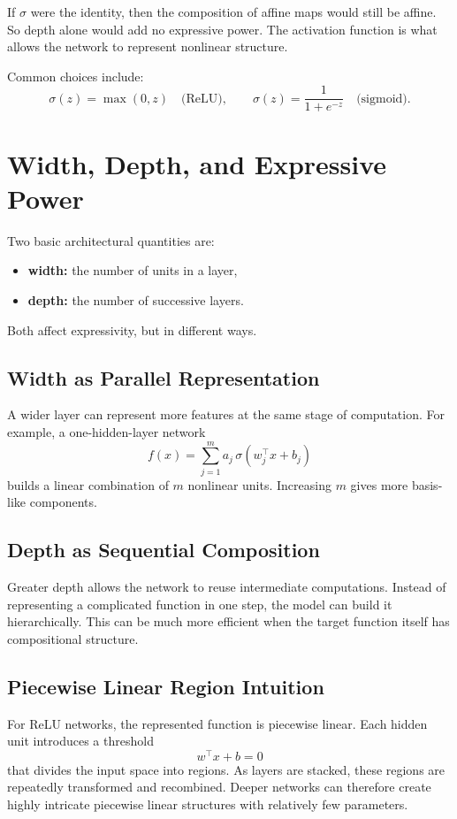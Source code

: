 If $\sigma$ were the identity, then the composition of affine maps would still be affine. So depth alone would add no expressive power. The activation function is what allows the network to represent nonlinear structure.

Common choices include:
\[
\sigma(z)=\max(0,z)\quad\text{(ReLU)},
\qquad
\sigma(z)=\frac{1}{1+e^{-z}}\quad\text{(sigmoid)}.
\]

\section{Width, Depth, and Expressive Power}

Two basic architectural quantities are:
\begin{itemize}
    \item \textbf{width:} the number of units in a layer,
    \item \textbf{depth:} the number of successive layers.
\end{itemize}

Both affect expressivity, but in different ways.

\subsection{Width as Parallel Representation}

A wider layer can represent more features at the same stage of computation. For example, a one-hidden-layer network
\[
f(x)=\sum_{j=1}^m a_j\,\sigma(w_j^\top x+b_j)
\]
builds a linear combination of $m$ nonlinear units. Increasing $m$ gives more basis-like components.

\subsection{Depth as Sequential Composition}

Greater depth allows the network to reuse intermediate computations. Instead of representing a complicated function in one step, the model can build it hierarchically. This can be much more efficient when the target function itself has compositional structure.

\subsection{Piecewise Linear Region Intuition}

For ReLU networks, the represented function is piecewise linear. Each hidden unit introduces a threshold
\[
w^\top x+b=0
\]
that divides the input space into regions. As layers are stacked, these regions are repeatedly transformed and recombined. Deeper networks can therefore create highly intricate piecewise linear structures with relatively few parameters.

